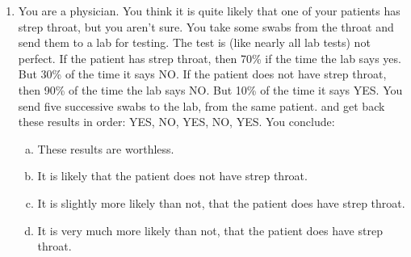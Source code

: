 \documentclass[11pt]{article}
\begin{document}
\begin{enumerate}
	\item You are a physician. You think it is quite likely that one of your patients has strep throat, 		but you aren't sure. You take some swabs from the throat and send them to a lab for testing. 			The test is (like nearly all lab tests) not perfect.  If the patient has strep throat, then 70\% if the 		time the lab says yes. But 30\% of the time it says NO. If the patient does not have strep throat, 		then 90\% of the time the lab says NO. But 10\% of the time it says YES. You send five 				successive swabs to the lab, from the same patient. and get back these results in order: YES, NO, 	YES, NO, YES. You conclude:
	\begin{enumerate}[(a)]
		\item These results are worthless.
		\item It is likely that the patient does not have strep throat.
		\item It is slightly more likely than not, that the patient does have strep throat.
		\item It is very much more likely than not, that the patient does have strep throat.
	\end{enumerate}
\end{enumerate}
	
\end{document}
